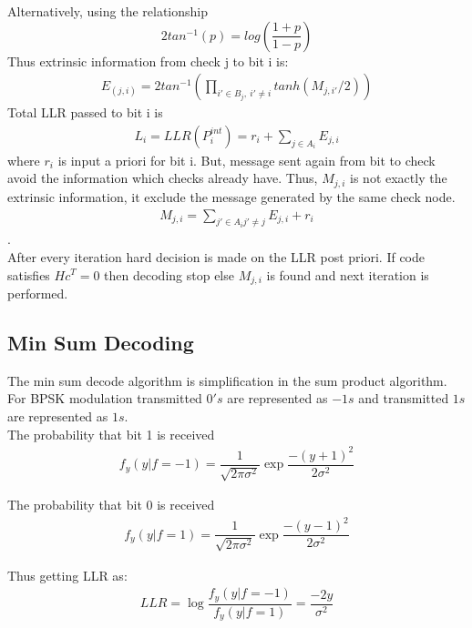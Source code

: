 Alternatively, using the relationship
\[ 2tan^{-1}(p)=log \left( \dfrac{1+p}{1-p} \right) \]
Thus extrinsic information from check j to bit i is:
\begin{align} E_{(j,i)} = 2tan^{-1} \left( \prod_{i'\in B_j ,\ i'\neq i }tanh(M_{j,i'}/2) \right) \end{align}
Total LLR passed to bit i is
\begin{align} L_i = LLR(P_i^{int}) = r_i + \sum_{j\in A_i} E_{j,i} \end{align}
where $r_i$ is input a priori for bit i.
But, message sent again from bit to check avoid the information which checks already have. Thus,
$M_{j,i}$ is not exactly the extrinsic information, it exclude the message generated by the same check node.\\
\begin{align}  M_{j,i} = \sum_{j'\in A_i j'\neq j} E_{j,i} + r_i \end{align}.\\
     

After every iteration hard decision is made on the LLR post priori. If code satisfies $Hc^T=0$ then decoding stop else $M_{j,i}$ is found and next iteration is performed.
\subsection{Min Sum Decoding}
The min sum decode algorithm is simplification in the sum product algorithm. \\
For BPSK modulation transmitted $0's$ are represented as $-1s$ and transmitted $1s$ are represented as $1s$. \\
The probability that bit 1 is received 
\begin{align} f_y(y|f=-1) = \dfrac{1}{\sqrt{2\pi\sigma^{2}}} \exp{\dfrac{-(y+1)^2}{2\sigma^2}}
 \end{align}
 

The probability that bit 0 is received 
\begin{align} f_y(y|f=1) = \dfrac{1}{\sqrt{2\pi\sigma^{2}}} \exp{\dfrac{-(y-1)^2}{2\sigma^2}}
 \end{align}
 
Thus getting LLR as:
\begin{align}  LLR = \log\dfrac{f_y(y|f=-1)}{f_y(y|f=1)} = \dfrac{-2y}{\sigma^2}
 \end{align}
 
